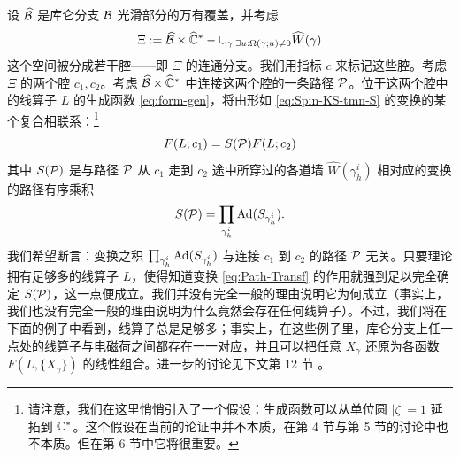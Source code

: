 设 $\widehat{\mathcal{B}}$ 是库仑分支 $\mathcal{B}$ 光滑部分的万有覆盖，并考虑
\begin{equation}\label{eq:Chamber-Space}
\Xi: =  \widehat{\mathcal{B}} \times \widehat{\mathbb{C}}^* - \cup_{\gamma: \exists u: \Omega(\gamma;u) \ne 0 }  \widehat{W}(\gamma)
\end{equation}
这个空间被分成若干腔——即 $\Xi$ 的连通分支。我们用指标 $c$ 来标记这些腔。考虑 $\Xi$ 的两个腔 $c_1,c_2$。考虑 $\widehat{\mathcal{B}} \times \widehat{\mathbb{C}}^*$ 中连接这两个腔的一条路径 $\mathcal{P}$。位于这两个腔中的线算子 $L$ 的生成函数 \eqref{eq:form-gen}，将由形如 \eqref{eq:Spin-KS-tmn-S} 的变换的某个复合相联系：\footnote{请注意，我们在这里悄悄引入了一个假设：生成函数可以从单位圆 $\vert \zeta \vert =1$ 延拓到 $\mathbb{C}^*$。这个假设在当前的论证中并不本质，在第 4 节与第 5 节的讨论中也不本质。但在第 6 节中它将很重要。}%
\begin{equation}\label{eq:Path-Transf}
F(L;c_1) = S(\mathcal{P})  F(L;c_2)
\end{equation}
其中 $S(\mathcal{P})$ 是与路径 $\mathcal{P}$ 从 $c_1$ 走到 $c_2$ 途中所穿过的各道墙 $\widehat{W}(\gamma_h^i)$ 相对应的变换的路径有序乘积
\begin{equation}
S(\mathcal{P})= \prod_{\gamma_h^i} {\rm Ad}(S_{\gamma_h^i} ).
\end{equation}
我们希望断言：变换之积 $\prod_{\gamma_h^i} {\rm Ad}(S_{\gamma_h^i} )$ 与连接 $c_1$ 到 $c_2$ 的路径 $\mathcal{P}$ 无关。只要理论拥有足够多的线算子 $L$，使得知道变换 \eqref{eq:Path-Transf} 的作用就强到足以完全确定 $S(\mathcal{P})$，这一点便成立。我们并没有完全一般的理由说明它为何成立（事实上，我们也没有完全一般的理由说明为什么竟然会存在任何线算子）。不过，我们将在下面的例子中看到，线算子总是足够多；事实上，在这些例子里，库仑分支上任一点处的线算子与电磁荷之间都存在一一对应，并且可以把任意 $X_\gamma$ 还原为各函数 $F(L,\{X_\gamma\})$ 的线性组合。进一步的讨论见下文第 12 节%
。


